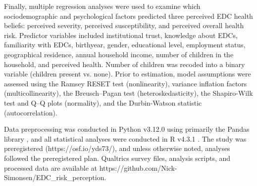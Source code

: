 Finally, multiple regression analyses were used to examine which sociodemographic and psychological factors predicted three perceived EDC health beliefs: perceived severity, perceived susceptibility, and perceived overall health risk. Predictor variables included institutional trust, knowledge about EDCs, familiarity with EDCs, birthyear, gender, educational level, employment status, geographical residence, annual household income, number of children in the household, and perceived health. Number of children was recoded into a binary variable (children present vs. none). Prior to estimation, model assumptions were assessed using the Ramsey RESET test (nonlinearity), variance inflation factors (multicollinearity), the Breusch--Pagan test (heteroskedasticity), the Shapiro-Wilk test and Q--Q plots (normality), and the Durbin-Watson statistic (autocorrelation).

Data preprocessing was conducted in Python v3.12.0 \citep{python} using primarily the Pandas library \citep{pandas}, and all statistical analyses were conducted in R v4.3.1 \citep{rRef}. The study was preregistered (https://osf.io/yds73/), and unless otherwise noted, analyses followed the preregistered plan. Qualtrics survey files, analysis scripts, and processed data are available at https://github.com/Nick-Simonsen/EDC\_risk\_perception.
